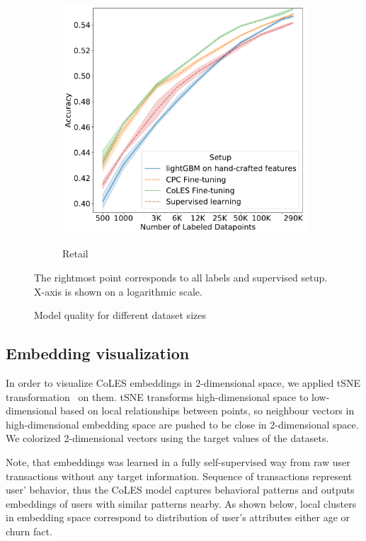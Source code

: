 \documentclass{article}
\begin{document}
\begin{figure}
\begin{subfigure}{0.5\linewidth}
  \end{subfigure}%
  \begin{subfigure}{0.5\linewidth}
    \caption{Retail}
    \includegraphics[width=\linewidth]{figures/ss_x5.pdf}
    \label{fig-semi-retail}
  \end{subfigure}
  \caption{Model quality for different dataset sizes} \small{The rightmost point corresponds to all labels and supervised setup. X-axis is shown on a logarithmic scale.}
  \label{fig-semi}
\end{figure}

\subsection{Embedding visualization} \label{app-sec-vis}

In order to visualize CoLES embeddings in 2-dimensional space, we applied tSNE transformation~\citep{Maaten2008VisualizingDU} on them. tSNE transforms high-dimensional space to low-dimensional based on local relationships between points, so neighbour vectors in high-dimensional embedding space are pushed to be close in 2-dimensional space. We colorized 2-dimensional vectors using the target values of the datasets.

Note, that embeddings was learned in a fully self-supervised way from raw user transactions without any target information. Sequence of transactions represent user' behavior, thus the CoLES model captures behavioral patterns and outputs embeddings of users with similar patterns nearby.
As shown below, local clusters in embedding space correspond to distribution of user's attributes either age or churn fact.
\end{document}
